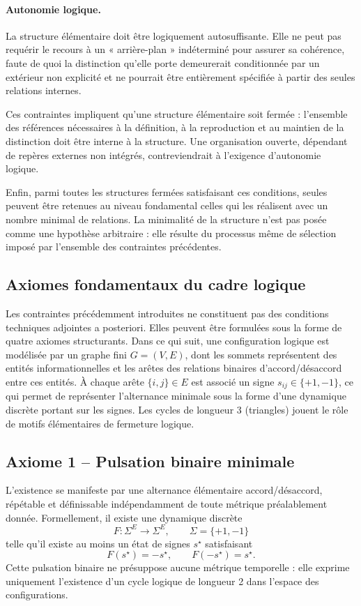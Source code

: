 \documentclass[11pt,a4paper]{article}
\begin{document}
\paragraph{Autonomie logique.}
La structure élémentaire doit être logiquement autosuffisante. Elle ne peut pas requérir le recours à un « arrière-plan » indéterminé pour assurer sa cohérence, faute de quoi la distinction qu’elle porte demeurerait conditionnée par un extérieur non explicité et ne pourrait être entièrement spécifiée à partir des seules relations internes.

Ces contraintes impliquent qu’une structure élémentaire soit fermée : l’ensemble des références nécessaires à la définition, à la reproduction et au maintien de la distinction doit être interne à la structure. Une organisation ouverte, dépendant de repères externes non intégrés, contreviendrait à l’exigence d’autonomie logique.

Enfin, parmi toutes les structures fermées satisfaisant ces conditions, seules peuvent être retenues au niveau fondamental celles qui les réalisent avec un nombre minimal de relations. La minimalité de la structure n’est pas posée comme une hypothèse arbitraire : elle résulte du processus même de sélection imposé par l’ensemble des contraintes précédentes.

\subsection*{Axiomes fondamentaux du cadre logique}

Les contraintes précédemment introduites ne constituent pas des conditions techniques adjointes a posteriori. Elles peuvent être formulées sous la forme de quatre axiomes structurants. Dans ce qui suit, une configuration logique est modélisée par un graphe fini \(G = (V,E)\), dont les sommets représentent des entités informationnelles et les arêtes des relations binaires d’accord/désaccord entre ces entités. À chaque arête \(\{i,j\} \in E\) est associé un signe \(s_{ij} \in \{+1,-1\}\), ce qui permet de représenter l’alternance minimale sous la forme d’une dynamique discrète portant sur les signes. Les cycles de longueur 3 (triangles) jouent le rôle de motifs élémentaires de fermeture logique.

\subsection*{Axiome 1 – Pulsation binaire minimale}

L’existence se manifeste par une alternance élémentaire accord/désaccord, répétable et définissable indépendamment de toute métrique préalablement donnée. Formellement, il existe une dynamique discrète
\[
F : \Sigma^E \rightarrow \Sigma^E,\qquad \Sigma = \{+1,-1\}
\]
telle qu’il existe au moins un état de signes \(s^\star\) satisfaisant
\[
F(s^\star) = -s^\star,\qquad F(-s^\star) = s^\star.
\]
Cette pulsation binaire ne présuppose aucune métrique temporelle : elle exprime uniquement l’existence d’un cycle logique de longueur 2 dans l’espace des configurations.
\end{document}
